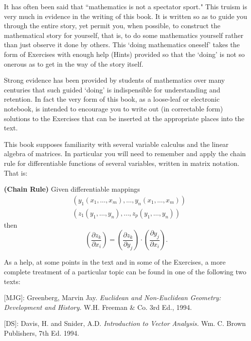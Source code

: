 \documentclass{ximera}
\begin{document}
It has often been said that \textquotedblleft mathematics is not a spectator
sport." This truism is very much in evidence in the writing of this book. It
is written so as to guide you through the entire story, yet permit you, when
possible, to construct the mathematical story for yourself, that is, to do
some mathematics yourself rather than just observe it done by others. This
`doing mathematics oneself' takes the form of Exercises with enough help
(Hints) provided so that the `doing' is not so onerous as to get in the way of
the story itself.

Strong evidence has been provided by students of mathematics over many
centuries that such guided `doing' is indispensible for understanding and
retention. In fact the very form of this book, as a loose-leaf or electronic
notebook, is intended to encourage you to write out (in correctable form)
solutions to the Exercises that can be inserted at the appropriate places into
the text.

This book supposes familiarity with several variable calculus and the linear
algebra of matrices. In particular you will need to remember and apply the
chain rule for differentiable functions of several variables, written in
matrix notation. That is:

\begin{theorem}
\textbf{(Chain Rule)} Given differentiable mappings%
\begin{align*}
&  \left(  y_{1}\left(  x_{1},\ldots,x_{m}\right)  ,\ldots,y_{n}\left(
x_{1},\ldots,x_{m}\right)  \right) \\
&  \left(  z_{1}\left(  y_{1},\ldots,y_{n}\right)  ,\ldots,z_{p}\left(
y_{1},\ldots,y_{n}\right)  \right)
\end{align*}
then%
\[
\left(  \frac{\partial z_{k}}{\partial x_{i}}\right)  =\left(  \frac{\partial
z_{k}}{\partial y_{j}}\right)  \cdot\left(  \frac{\partial y_{j}}{\partial
x_{i}}\right)  .
\]

\end{theorem}

As a help, at some points in the text and in some of the Exercises, a more
complete treatment of a particular topic can be found in one of the following
two texts:

[MJG]: Greenberg, Marvin Jay. \textit{Euclidean and Non-Euclidean Geometry:
Development and History.} W.H. Freeman \& Co. 3rd Ed., 1994.

[DS]: Davis, H. and Snider, A.D. \textit{Introduction to Vector Analysis.} Wm.
C. Brown Publishers, 7th Ed. 1994.
\end{document}

